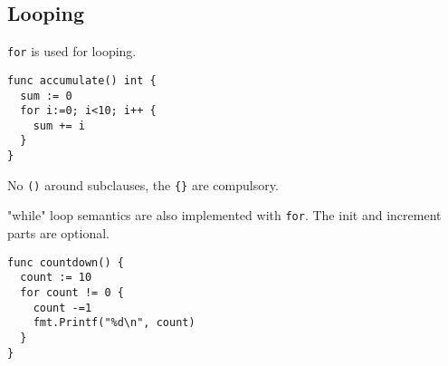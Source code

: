 \subsection{Looping}
\texttt{for} is used for looping. 

\begin{lstlisting}
func accumulate() int {
  sum := 0
  for i:=0; i<10; i++ {
    sum += i
  }
}
\end{lstlisting}

No \texttt{()} around subclauses, the \texttt{\{\}} are compulsory.

"while" loop semantics are also implemented with \texttt{for}. The
init and increment parts are optional.

\begin{lstlisting}
func countdown() {
  count := 10
  for count != 0 {
    count -=1
    fmt.Printf("%d\n", count)
  }
}
\end{lstlisting}

